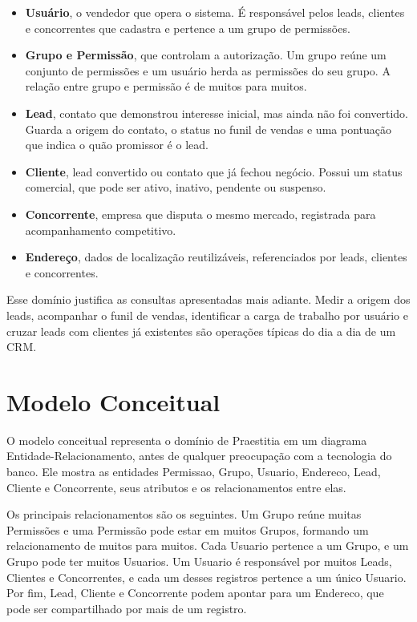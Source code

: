 \documentclass[a4paper]{article}
\begin{document}
\begin{itemize}
    \item \textbf{Usuário}, o vendedor que opera o sistema. É responsável pelos leads,
    clientes e concorrentes que cadastra e pertence a um grupo de permissões.
    \item \textbf{Grupo e Permissão}, que controlam a autorização. Um grupo reúne um
    conjunto de permissões e um usuário herda as permissões do seu grupo. A relação entre
    grupo e permissão é de muitos para muitos.
    \item \textbf{Lead}, contato que demonstrou interesse inicial, mas ainda não foi
    convertido. Guarda a origem do contato, o status no funil de vendas e uma pontuação
    que indica o quão promissor é o lead.
    \item \textbf{Cliente}, lead convertido ou contato que já fechou negócio. Possui um
    status comercial, que pode ser ativo, inativo, pendente ou suspenso.
    \item \textbf{Concorrente}, empresa que disputa o mesmo mercado, registrada para
    acompanhamento competitivo.
    \item \textbf{Endereço}, dados de localização reutilizáveis, referenciados por leads,
    clientes e concorrentes.
\end{itemize}

Esse domínio justifica as consultas apresentadas mais adiante. Medir a origem dos leads,
acompanhar o funil de vendas, identificar a carga de trabalho por usuário e cruzar leads
com clientes já existentes são operações típicas do dia a dia de um CRM.

\section{Modelo Conceitual}

O modelo conceitual representa o domínio de Praestitia em um diagrama
Entidade-Relacionamento, antes de qualquer preocupação com a tecnologia do banco. Ele
mostra as entidades Permissao, Grupo, Usuario, Endereco, Lead, Cliente e Concorrente, seus
atributos e os relacionamentos entre elas.

Os principais relacionamentos são os seguintes. Um Grupo reúne muitas Permissões e uma
Permissão pode estar em muitos Grupos, formando um relacionamento de muitos para muitos.
Cada Usuario pertence a um Grupo, e um Grupo pode ter muitos Usuarios. Um Usuario é
responsável por muitos Leads, Clientes e Concorrentes, e cada um desses registros pertence
a um único Usuario. Por fim, Lead, Cliente e Concorrente podem apontar para um Endereco,
que pode ser compartilhado por mais de um registro.
\end{document}

